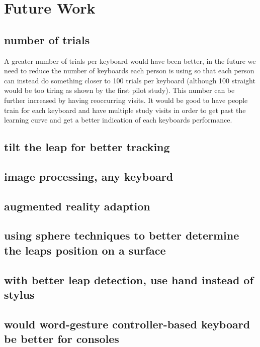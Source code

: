\section{Future Work}

\subsection{number of trials}

A greater number of trials per keyboard would have been better, in the future we need to reduce the number of keyboards each person is using so that each person can instead do something closer to 100 trials per keyboard (although 100 straight would be too tiring as shown by the first pilot study). This number can be further increased by having reoccurring visits. It would be good to have people train for each keyboard and have multiple study visits in order to get past the learning curve and get a better indication of each keyboards performance.

\subsection{tilt the leap for better tracking}

\subsection{image processing, any keyboard}

\subsection{augmented reality adaption}

\subsection{using sphere techniques to better determine the leaps position on a surface}

\subsection{with better leap detection, use hand instead of stylus}

\subsection{would word-gesture controller-based keyboard be better for consoles}

